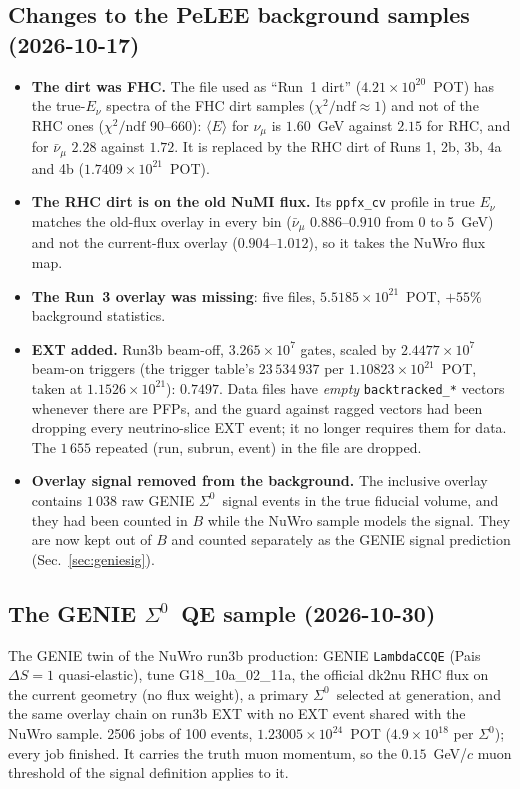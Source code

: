 \documentclass[11pt,a4paper]{article}
\newcommand{\Szero}{\ensuremath{\Sigma^{0}}}
\newcommand{\numubar}{\ensuremath{\bar{\nu}_\mu}}
\begin{document}
\subsection{Changes to the PeLEE background samples (2026-10-17)}
\label{sec:samplechanges}

\begin{itemize}
  \item \textbf{The dirt was FHC.} The file used as ``Run~1 dirt''
        ($4.21\times10^{20}$~POT) has the true-$E_\nu$ spectra of the FHC dirt
        samples ($\chi^2/\mathrm{ndf}\approx1$) and not of the RHC ones
        ($\chi^2/\mathrm{ndf}$ 90--660): $\langle E\rangle$ for $\nu_\mu$ is $1.60$~GeV
        against $2.15$ for RHC, and for $\numubar$ $2.28$ against $1.72$. It is replaced
        by the RHC dirt of Runs 1, 2b, 3b, 4a and 4b ($1.7409\times10^{21}$~POT).
  \item \textbf{The RHC dirt is on the old NuMI flux.} Its \texttt{ppfx\_cv} profile in
        true $E_\nu$ matches the old-flux overlay in every bin ($\numubar$
        $0.886$--$0.910$ from 0 to 5~GeV) and not the current-flux overlay
        ($0.904$--$1.012$), so it takes the NuWro flux map.
  \item \textbf{The Run~3 overlay was missing}: five files, $5.5185\times10^{21}$~POT,
        $+55\%$ background statistics.
  \item \textbf{EXT added.} Run3b beam-off, $3.265\times10^{7}$ gates, scaled by
        $2.4477\times10^{7}$ beam-on triggers (the trigger table's $23\,534\,937$ per
        $1.10823\times10^{21}$~POT, taken at $1.1526\times10^{21}$): $0.7497$. Data
        files have \emph{empty} \texttt{backtracked\_*} vectors whenever there are
        PFPs, and the guard against ragged vectors had been dropping every
        neutrino-slice EXT event; it no longer requires them for data. The $1\,655$
        repeated (run, subrun, event) in the file are dropped.
  \item \textbf{Overlay signal removed from the background.} The inclusive overlay
        contains $1\,038$ raw GENIE \Szero\ signal events in the true fiducial volume,
        and they had been counted in $B$ while the NuWro sample models the signal. They
        are now kept out of $B$ and counted separately as the GENIE signal prediction
        (Sec.~\ref{sec:geniesig}).
\end{itemize}

\subsection{The GENIE \Szero\ QE sample (2026-10-30)}
\label{sec:genieqe}
The GENIE twin of the NuWro run3b production: GENIE \texttt{LambdaCCQE} (Pais
$\Delta S=1$ quasi-elastic), tune G18\_10a\_02\_11a, the official dk2nu RHC flux on the
current geometry (no flux weight), a primary \Szero\ selected at generation, and the
same overlay chain on run3b EXT with no EXT event shared with the NuWro sample.
2506 jobs of 100 events, $1.23005\times10^{24}$~POT ($4.9\times10^{18}$ per \Szero);
every job finished. It carries the truth muon momentum, so the $0.15$~GeV/$c$ muon
threshold of the signal definition applies to it.
\end{document}
